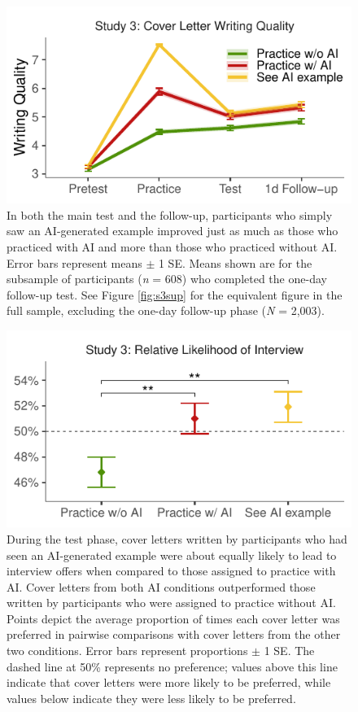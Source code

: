 \documentclass[11pt]{report}
\begin{document}
\begin{mainf}
\begin{figure}[t]
    \centering
    \includegraphics[width=\linewidth]{average_test_rewritten_lines_raw.pdf}
    \caption{
    In both the main test and the follow-up, participants who simply saw an AI-generated example improved just as much as those who practiced with AI and more than those who practiced without AI.
    Error bars represent means $\pm$ 1 SE.
    Means shown are for the subsample of participants  (\textit{n} = 608) who completed the one-day follow-up test.
    See Figure \ref{fig:s3sup} for the equivalent figure in the full sample, excluding the one-day follow-up phase (\textit{N} = 2,003).}
    \label{fig:s3}
\end{figure}

\begin{figure}[]
    \centering
    \includegraphics[width=1\linewidth]{ratings2.pdf}
    \caption{During the test phase, cover letters written by participants who had seen an AI-generated example were about equally likely to lead to interview offers when compared to those assigned to practice with AI. Cover letters from both AI conditions outperformed those written by participants who were assigned to practice without AI. Points depict the average proportion of times each cover letter was preferred in pairwise comparisons with cover letters from the other two conditions. Error bars represent proportions $\pm$ 1 SE. The dashed line at 50\% represents no preference; values above this line indicate that cover letters were more likely to be preferred, while values below indicate they were less likely to be preferred.}
    \label{fig:ratings2}
\end{figure}





\end{mainf}
\end{document}
